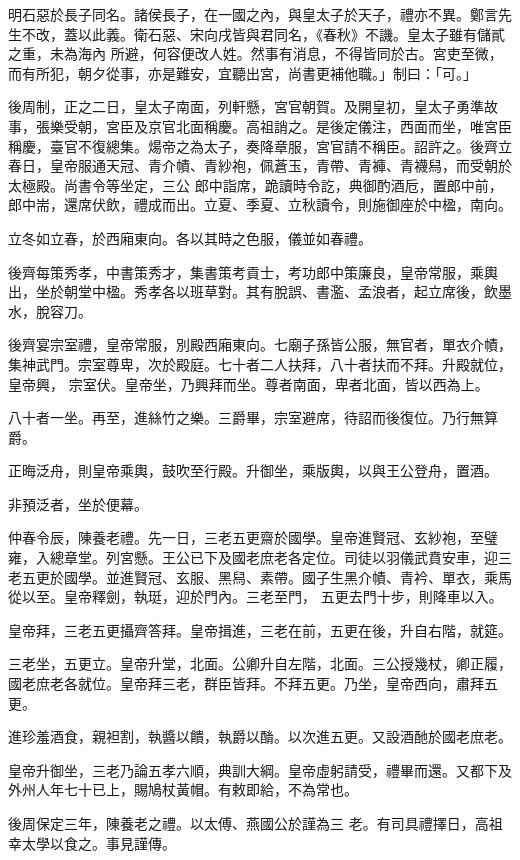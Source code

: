 \begin{pinyinscope}
 明石惡於長子同名。諸侯長子，在一國之內，與皇太子於天子，禮亦不異。鄭言先生不改，蓋以此義。衛石惡、宋向戌皆與君同名，《春秋》不譏。皇太子雖有儲貳之重，未為海內
 所避，何容便改人姓。然事有消息，不得皆同於古。宮吏至微，而有所犯，朝夕從事，亦是難安，宜聽出宮，尚書更補他職。」制曰：「可。」



 後周制，正之二日，皇太子南面，列軒懸，宮官朝賀。及開皇初，皇太子勇準故事，張樂受朝，宮臣及京官北面稱慶。高祖誚之。是後定儀注，西面而坐，唯宮臣稱慶，臺官不復總集。煬帝之為太子，奏降章服，宮官請不稱臣。詔許之。後齊立春日，皇帝服通天冠、青介幘、青紗袍，佩蒼玉，青帶、青褲、青襪舄，而受朝於太極殿。尚書令等坐定，三公
 郎中詣席，跪讀時令訖，典御酌酒卮，置郎中前，郎中耑，還席伏飲，禮成而出。立夏、季夏、立秋讀令，則施御座於中楹，南向。



 立冬如立春，於西廂東向。各以其時之色服，儀並如春禮。



 後齊每策秀孝，中書策秀才，集書策考貢士，考功郎中策廉良，皇帝常服，乘輿出，坐於朝堂中楹。秀孝各以班草對。其有脫誤、書濫、孟浪者，起立席後，飲墨水，脫容刀。



 後齊宴宗室禮，皇帝常服，別殿西廂東向。七廟子孫皆公服，無官者，單衣介幘，集神武門。宗室尊卑，次於殿庭。七十者二人扶拜，八十者扶而不拜。升殿就位，皇帝興，
 宗室伏。皇帝坐，乃興拜而坐。尊者南面，卑者北面，皆以西為上。



 八十者一坐。再至，進絲竹之樂。三爵畢，宗室避席，待詔而後復位。乃行無算爵。



 正晦泛舟，則皇帝乘輿，鼓吹至行殿。升御坐，乘版輿，以與王公登舟，置酒。



 非預泛者，坐於便幕。



 仲春令辰，陳養老禮。先一日，三老五更齋於國學。皇帝進賢冠、玄紗袍，至璧雍，入總章堂。列宮懸。王公已下及國老庶老各定位。司徒以羽儀武賁安車，迎三老五更於國學。並進賢冠、玄服、黑舄、素帶。國子生黑介幘、青衿、單衣，乘馬從以至。皇帝釋劍，執珽，迎於門內。三老至門，
 五更去門十步，則降車以入。



 皇帝拜，三老五更攝齊答拜。皇帝揖進，三老在前，五更在後，升自右階，就筵。



 三老坐，五更立。皇帝升堂，北面。公卿升自左階，北面。三公授幾杖，卿正履，國老庶老各就位。皇帝拜三老，群臣皆拜。不拜五更。乃坐，皇帝西向，肅拜五更。



 進珍羞酒食，親袒割，執醬以饋，執爵以酳。以次進五更。又設酒酏於國老庶老。



 皇帝升御坐，三老乃論五孝六順，典訓大綱。皇帝虛躬請受，禮畢而還。又都下及外州人年七十已上，賜鳩杖黃帽。有敕即給，不為常也。



 後周保定三年，陳養老之禮。以太傅、燕國公於謹為三
 老。有司具禮擇日，高祖幸太學以食之。事見謹傳。



\end{pinyinscope}